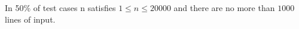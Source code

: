 In 50\% of test cases n satisfies $1 \le n \le 20000$ and there are no more than $1000$ lines of input.
